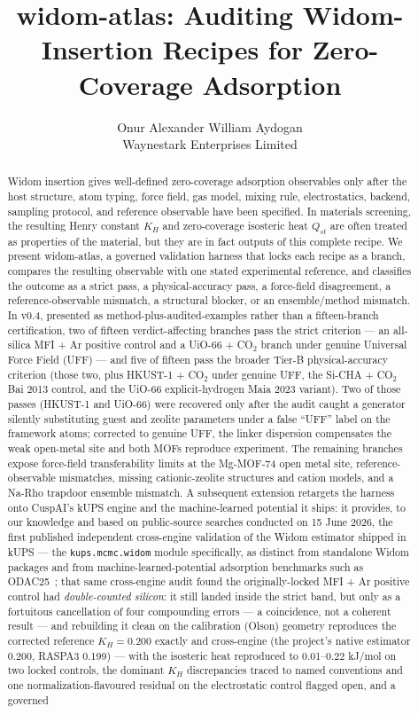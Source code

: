 \documentclass[11pt,a4paper]{article}
\title{widom-atlas: Auditing Widom-Insertion Recipes for Zero-Coverage Adsorption}
\author{Onur Alexander William Aydogan\\
Waynestark Enterprises Limited}
\date{}
\begin{document}
\maketitle

\begin{abstract}
Widom insertion gives well-defined zero-coverage adsorption observables only after the host structure, atom typing, force field, gas model, mixing rule, electrostatics, backend, sampling protocol, and reference observable have been specified. In materials screening, the resulting Henry constant \(K_H\) and zero-coverage isosteric heat \(Q_{st}\) are often treated as properties of the material, but they are in fact outputs of this complete recipe. We present widom-atlas, a governed validation harness that locks each recipe as a branch, compares the resulting observable with one stated experimental reference, and classifies the outcome as a strict pass, a physical-accuracy pass, a force-field disagreement, a reference-observable mismatch, a structural blocker, or an ensemble/method mismatch. In v0.4, presented as method-plus-audited-examples rather than a fifteen-branch certification, two of fifteen verdict-affecting branches pass the strict criterion --- an all-silica MFI + Ar positive control and a UiO-66 + CO\(_2\) branch under genuine Universal Force Field (UFF) --- and five of fifteen pass the broader Tier-B physical-accuracy criterion (those two, plus HKUST-1 + CO\(_2\) under genuine UFF, the Si-CHA + CO\(_2\) Bai 2013 control, and the UiO-66 explicit-hydrogen Maia 2023 variant). Two of those passes (HKUST-1 and UiO-66) were recovered only after the audit caught a generator silently substituting guest and zeolite parameters under a false ``UFF'' label on the framework atoms; corrected to genuine UFF, the linker dispersion compensates the weak open-metal site and both MOFs reproduce experiment. The remaining branches expose force-field transferability limits at the Mg-MOF-74 open metal site, reference-observable mismatches, missing cationic-zeolite structures and cation models, and a Na-Rho trapdoor ensemble mismatch. A subsequent extension retargets the harness onto CuspAI's kUPS engine and the machine-learned potential it ships: it provides, to our knowledge and based on public-source searches conducted on 15 June 2026, the first published independent cross-engine validation of the Widom estimator shipped in kUPS --- the \texttt{kups.mcmc.widom} module specifically, as distinct from standalone Widom packages and from machine-learned-potential adsorption benchmarks such as ODAC25~\cite{ODAC25}; that same cross-engine audit found the originally-locked MFI + Ar positive control had \emph{double-counted silicon}: it still landed inside the strict band, but only as a fortuitous cancellation of four compounding errors --- a coincidence, not a coherent result --- and rebuilding it clean on the calibration (Olson) geometry reproduces the corrected reference \(K_H = 0.200\) exactly and cross-engine (the project's native estimator 0.200, RASPA3 0.199) --- with the isosteric heat reproduced to 0.01--0.22 kJ/mol on two locked controls, the dominant \(K_H\) discrepancies traced to named conventions and one normalization-flavoured residual on the electrostatic control flagged open, and a governed 
\end{abstract}
\end{document}
